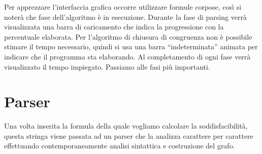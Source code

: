 \documentclass[a4paper,11pt]{article} %
\begin{document}
Per apprezzare %
l'interfaccia grafica occorre utilizzare formule corpose, cos\`i
si noter\`a %
che fase dell'algoritmo %
\`e in esecuzione.
Durante la fase di parsing verr\`a visualizzata
una
barra di caricamento che indica la progressione con la percentuale elaborata. 
Per l'algoritmo di chiusura di congruenza %
non è 
possibile stimare %
il tempo necessario, %
quindi si usa una barra ``indeterminata'' animata per indicare che il programma sta elaborando.
%
Al completamento di ogni fase verr\`a visualizzato il tempo impiegato.
Passiamo alle fasi pi\`u importanti.  

\vspace{-1ex}
\section{Parser}\label{sec: parser}
Una volta inserita la formula della quale vogliamo calcolare la soddisfacibilit\`a,
questa stringa viene passata ad un parser che la analizza carattere per carattere effettuando
contemporaneamente analisi sintattica e costruzione del grafo.
\vspace{-1ex}
\end{document}
